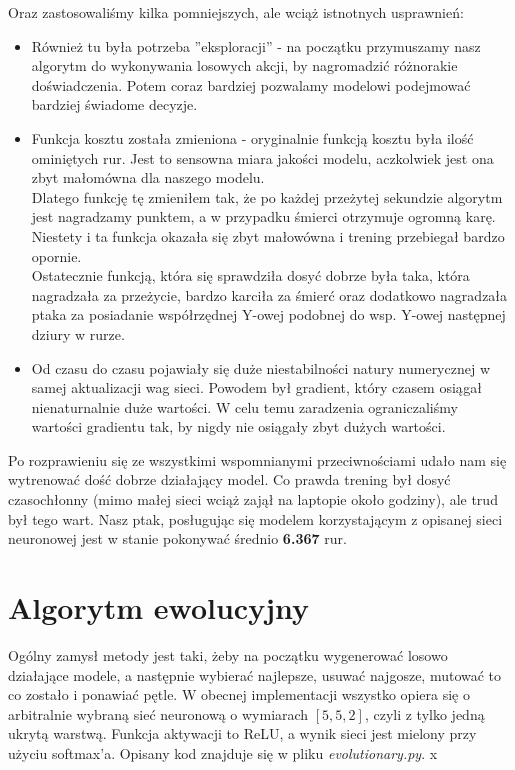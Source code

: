 \documentclass[12pt, A4]{article}
\begin{document}
\begin{itemize}
\begin{itemize}
\begin{itemize}
	\end{itemize}
	Oraz zastosowaliśmy kilka pomniejszych, ale wciąż istnotnych usprawnień:
	\begin{itemize}
	\item Również tu była potrzeba ''eksploracji'' - na początku przymuszamy nasz algorytm do wykonywania losowych akcji, by nagromadzić różnorakie doświadczenia. Potem coraz bardziej pozwalamy modelowi podejmować bardziej świadome decyzje.
	\item Funkcja kosztu została zmieniona - oryginalnie funkcją kosztu była ilość ominiętych rur. Jest to sensowna miara jakości modelu, aczkolwiek jest ona zbyt małomówna dla naszego modelu. \\
	Dlatego funkcję tę zmieniłem tak, że po każdej przeżytej sekundzie algorytm jest nagradzamy punktem, a w przypadku śmierci otrzymuje ogromną karę. Niestety i ta funkcja okazała się zbyt małowówna i trening przebiegał bardzo opornie. \\
	Ostatecznie funkcją, która się sprawdziła dosyć dobrze była taka, która nagradzała za przeżycie, bardzo karciła za śmierć oraz dodatkowo nagradzała ptaka za posiadanie współrzędnej Y-owej podobnej do wsp. Y-owej następnej dziury w rurze. 
	\item Od czasu do czasu pojawiały się duże niestabilności natury numerycznej w samej aktualizacji wag sieci. Powodem był gradient, który czasem osiągał nienaturnalnie duże wartości. W celu temu zaradzenia ograniczaliśmy wartości gradientu tak, by nigdy nie osiągały zbyt dużych wartości. 
	\end{itemize}
	Po rozprawieniu się ze wszystkimi wspomnianymi przeciwnościami udało nam się wytrenować dość dobrze działający model. Co prawda trening był dosyć czasochłonny (mimo małej sieci wciąż zajął na laptopie około godziny), ale trud był tego wart. Nasz ptak, posługując się modelem korzystającym z opisanej sieci neuronowej jest w stanie pokonywać średnio \textbf{6.367} rur.


\section{Algorytm ewolucyjny}
Ogólny zamysł metody jest taki, żeby na początku wygenerować losowo działające modele, a następnie wybierać najlepsze, usuwać najgosze, mutować to co zostało i ponawiać pętle.
\newline
W obecnej implementacji wszystko opiera się o arbitralnie wybraną sieć neuronową o wymiarach $[5, 5, 2]$, czyli z tylko jedną ukrytą warstwą. Funkcja aktywacji to ReLU, a wynik sieci jest mielony przy użyciu softmax'a. Opisany kod znajduje się w pliku \textit{evolutionary.py}.
x

\end{itemize}
\end{itemize}
\end{document}
